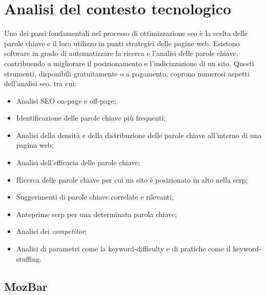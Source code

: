 \chapter{Analisi del contesto tecnologico}
\label{cap:analisi-soluzioni-esistenti}

\par Uno dei passi fondamentali nel processo di ottimizzazione \gls{seo} è la scelta delle parole chiave e il loro utilizzo in punti strategici delle pagine web. Esistono software in grado di automatizzare la ricerca e l'analisi delle parole chiave, contribuendo a migliorare il posizionamento e l'indicizzazione di un sito. Questi strumenti, disponibili gratuitamente o a pagamento, coprono numerosi aspetti dell'analisi \gls{seo}, tra cui:
\begin{itemize}
    \item Analisi SEO \gls{on-page} e \gls{off-page};
    \item Identificazione delle parole chiave più frequenti;
    \item Analisi della densità e della distribuzione delle parole chiave all'interno di una pagina web;
    \item Analisi dell'efficacia delle parole chiave;
    \item Ricerca delle parole chiave per cui un sito è posizionato in alto nella \gls{serp};
    \item Suggerimenti di parole chiave correlate e rilevanti;
    \item Anteprime \gls{serp} per una determinata parola chiave;
    \item Analisi dei \textit{competitor};
    \item Analisi di parametri come la \gls{keyword-difficulty} e di pratiche come il \gls{keyword-stuffing}.
\end{itemize}

\section{MozBar}

